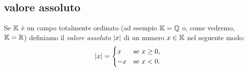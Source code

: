 \subsection{valore assoluto}

\begin{definition}
\mymark{***}
Se ${\mathbb K}$ è un campo totalmente ordinato (ad esempio ${\mathbb K}={\mathbb Q}$ o, come vedremo, ${\mathbb K}={\mathbb R}$)
definiamo il \emph{valore assoluto}%
%
 ${\left|x\right|}$ di un numero $x\in {\mathbb K}$ nel seguente modo:
\[
{\left|x\right|} =
\begin{cases}
  x & \text{se $x\ge 0$}, \\
  -x & \text{se $x<0 $}.
\end{cases}
\]
\end{definition}
  
